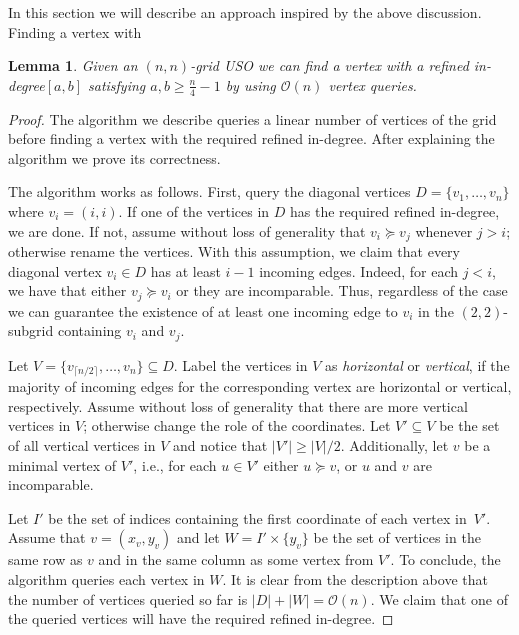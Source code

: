 \documentclass[a4paper,10pt]{article}
\newtheorem{lemma}{Lemma}
\newcommand{\indegree}{refined in-degree\xspace}
\begin{document}
In this section we will describe an approach inspired by the above discussion. Finding a vertex with 

\begin{lemma}
\label{lem:seed_lemma_for_square_matrices}
 Given an $(n, n)$-grid USO we can find a vertex with a \indegree $[a,b]$ satisfying $a, b \geq \frac{n}{4} - 1$ by using $\mathcal{O}(n)$ vertex queries.
\end{lemma}

\begin{proof}
The algorithm we describe queries a linear number of vertices of the grid before finding a vertex with the required \indegree. 
After explaining the algorithm we prove its correctness.
  
The algorithm works as follows. First, query the diagonal vertices $D = \{v_1,\ldots, v_n\}$ where $v_i = (i,i)$. If one of the vertices in $D$ has the required \indegree, we are done. If not, assume without loss of generality that $v_i \succeq v_j$ whenever $j > i$; otherwise rename the vertices. 
With this assumption, we claim that every diagonal vertex $v_i \in D$ has at least $i - 1$ incoming edges. Indeed, for each $j < i$, we have that either $v_j \succeq v_i$ or they are incomparable. Thus, regardless of the case we can guarantee the existence of at least one incoming edge to $v_i$ in the $(2, 2)$-subgrid containing $v_i$ and $v_j$. 

Let $V = \{v_{\lceil n/2 \rceil},\ldots,v_n\} \subseteq D$.
Label the vertices in $V$ as \emph{horizontal}  or \emph{vertical}, if the majority of incoming edges for the corresponding vertex are horizontal  or vertical, respectively. 
Assume without loss of generality that there are more vertical vertices in $V$; otherwise change the role of the coordinates. 
Let $V' \subseteq V$ be the set of all vertical vertices in $V$ and notice that $|V'| \geq |V|/2$.
 Additionally, let $v$ be a minimal vertex of $V'$, i.e., for each $u\in V'$ either $u\succeq v$, or $u$ and $v$ are incomparable. 

Let $I'$ be the set of indices containing the first coordinate of each vertex in~$V'$.
Assume that $v = (x_v, y_v)$ and let $W = I'\times \{y_v\}$ be the set of vertices in the same row as $v$ and in the same column as some vertex from $V'$.
To conclude, the algorithm queries each vertex in $W$.
It is clear from the description above that the number of vertices queried so far is $|D| + |W| = \mathcal{O}(n)$. 
We claim that one of the queried vertices will have the required \indegree.


\end{proof}
\end{document}
